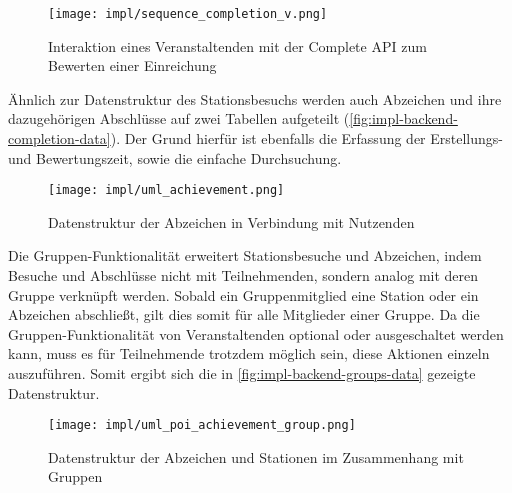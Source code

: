 \begin{figure}[htpb]
    \centering
    \texttt{[image: impl/sequence\_completion\_v.png]}
    \caption{Interaktion eines Veranstaltenden mit der Complete API zum Bewerten einer Einreichung}
    \label{fig:impl-backend-complete-seq-v}
\end{figure}

Ähnlich zur Datenstruktur des Stationsbesuchs werden auch Abzeichen und ihre
dazugehörigen Abschlüsse auf zwei Tabellen aufgeteilt (\autoref{fig:impl-backend-completion-data}). Der Grund hierfür ist
ebenfalls die Erfassung der Erstellungs- und Bewertungszeit, sowie die einfache
Durchsuchung.

\begin{figure}[htpb]
    \centering
    \texttt{[image: impl/uml\_achievement.png]}
    \caption{Datenstruktur der Abzeichen in Verbindung mit Nutzenden}
    \label{fig:impl-backend-completion-data}
\end{figure}

\newpage

Die Gruppen-Funktionalität erweitert Stationsbesuche und Abzeichen, indem
Besuche und Abschlüsse nicht mit Teilnehmenden, sondern analog mit deren Gruppe
verknüpft werden. Sobald ein Gruppenmitglied eine Station oder ein Abzeichen
abschließt, gilt dies somit für alle Mitglieder einer Gruppe. Da die
Gruppen-Funktionalität von Veranstaltenden optional oder ausgeschaltet werden
kann, muss es für Teilnehmende trotzdem möglich sein, diese Aktionen einzeln
auszuführen. Somit ergibt sich die in \autoref{fig:impl-backend-groups-data}
gezeigte Datenstruktur.

\begin{figure}[htpb]
    \centering
    \texttt{[image: impl/uml\_poi\_achievement\_group.png]}
    \caption{Datenstruktur der Abzeichen und Stationen im Zusammenhang mit Gruppen}
    \label{fig:impl-backend-groups-data}
\end{figure}


